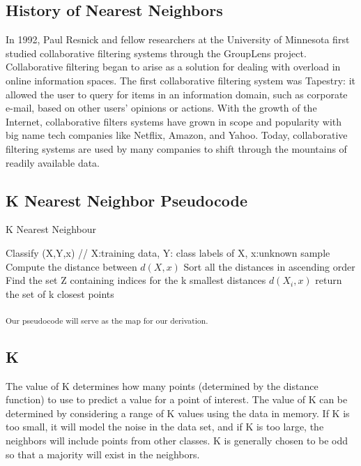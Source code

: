 \documentclass{report}
\begin{document}
\subsection*{History of Nearest Neighbors}

In 1992, Paul Resnick and fellow researchers at the University of Minnesota first studied collaborative filtering systems through the GroupLens project\cite{2}\cite{8}.  Collaborative filtering began to arise as a solution for dealing with overload in online information spaces. The first collaborative filtering system was Tapestry: it allowed the user to query for
items in an information domain, such as corporate e-mail, based on
other users’ opinions or actions\cite{6}. With the growth of the Internet, collaborative filters systems have grown in scope and popularity with big name tech companies like Netflix, Amazon, and Yahoo. Today, collaborative filtering systems are used by many companies to shift through the mountains of readily available data.

\subsection*{K Nearest Neighbor Pseudocode }
\begin{algorithm}
  \caption{K Nearest Neighbour}
  \begin{algorithmic}
  	\State Classify (X,Y,x) // X:training data, Y: class labels of X, x:unknown sample
	\State Compute the distance between $d(X, x)$
	\State Sort all the distances in ascending order
	\EndFor
	\State Find the set Z containing indices for the k smallest distances $d(X_{i},x)$
	\State return the set of k closest points 
  \end{algorithmic}
\end{algorithm}
\textsubscript{Our pseudocode will serve as the map for our derivation.}

\subsection*{K}

The value of K determines how many points (determined by the distance function) to use to predict a value for a point of interest.
The value of K can be determined by considering a range of K values using the data in memory.
If K is too small, it will model the noise in the data set, and if K is too large, the neighbors will include points from other classes.
K is generally chosen to be odd so that a majority will exist in the neighbors.
\end{document}
